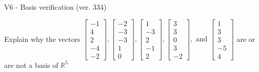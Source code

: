 \begin{exercise}
  \begin{exerciseTitle}V6 - Basis verification (ver. 334)\end{exerciseTitle}
  \begin{exerciseStatement}
    Explain why the vectors \(\left[\begin{array}{r}
-1 \\
4 \\
2 \\
-4 \\
-2
\end{array}\right] , \left[\begin{array}{r}
-2 \\
-3 \\
-3 \\
1 \\
0
\end{array}\right] , \left[\begin{array}{r}
1 \\
-3 \\
2 \\
-1 \\
2
\end{array}\right] , \left[\begin{array}{r}
3 \\
3 \\
0 \\
3 \\
-2
\end{array}\right] , \text{ and } \left[\begin{array}{r}
1 \\
3 \\
3 \\
-5 \\
4
\end{array}\right]\) are or are not a basis of \(\mathbb{R}^5\)	



\end{exerciseStatement}
\end{exercise}
